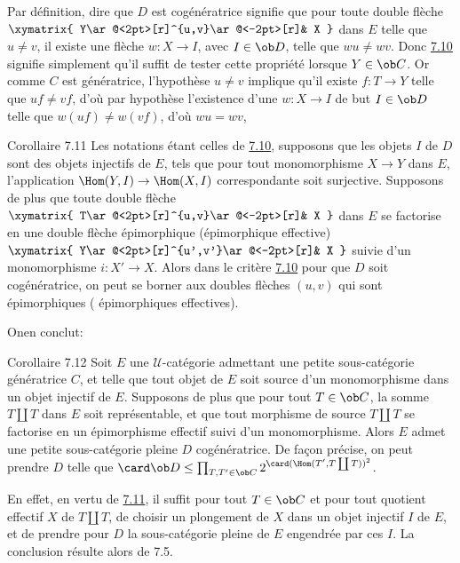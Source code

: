 Par définition, dire que $D$ est cogénératrice signifie que pour
toute double flèche $\xymatrix{ Y\ar@<2pt>[r]^{u,v}\ar@<-2pt>[r]& X
}$ dans $E$ telle que $u\neq v$, il existe une flèche
$w:X\rightarrow I$, avec $I\in\ob D$, telle que $wu\neq wv$. Donc
\hyperref[I.prop7.10]{7.10} signifie simplement qu'il suffit de tester cette
propriété lorsque $Y\in \ob C$. Or comme $C$ est génératrice,
l'hypothèse $u\neq v$ implique qu'il existe $f:T\rightarrow Y$ telle
que $uf\neq vf$, d'où par hypothèse l'existence d'une
$w:X\rightarrow I$ de but $I\in\ob D$ telle que $w(uf)\neq w(vf)$,
d'où $wu=wv$, \cqfd

\begin{enonce*}{Corollaire 7.11}
Les notations étant celles de \hyperref[I.prop7.10]{7.10}, supposons que les
objets $I$ de $D$ sont des objets injectifs de $E$, \ie tels que
pour tout monomorphisme $X\rightarrow Y$ dans $E$, l'application
$\Hom(Y,I)\rightarrow \Hom(X,I)$ correspondante soit surjective.
Supposons de plus que toute double flèche $\xymatrix{
T\ar@<2pt>[r]^{u,v}\ar@<-2pt>[r]& X }$ dans $E$ se factorise en une
double flèche épimorphique (\resp épimorphique effective)
$\xymatrix{ Y\ar@<2pt>[r]^{u',v'}\ar@<-2pt>[r]& X }$ suivie d'un
monomorphisme $i:X'\rightarrow X$. Alors dans le critère
\hyperref[I.prop7.10]{7.10} pour que $D$ soit cogénératrice, on peut se borner
aux doubles flèches $(u,v)$ qui sont épimorphiques (\resp
épimorphiques effectives).
\end{enonce*}

On\pageoriginale en conclut:

\begin{enonce*}{Corollaire 7.12}
Soit $E$ une $𝒰$-catégorie admettant une petite
sous-catégorie génératrice $C$, et telle que tout objet de $E$ soit
source d'un monomorphisme dans un objet injectif de $E$. Supposons
de plus que pour tout $T\in\ob C$, la somme $T\amalg T$ dans $E$
soit représentable, et que tout morphisme de source $T\amalg T$ se
factorise en un épimorphisme effectif suivi d'un monomorphisme.
Alors $E$ admet une petite sous-catégorie pleine $D$ cogénératrice.
De façon précise, on peut prendre $D$ telle que $\card \ob D\leq
\prod_{T,T'\in \ob C}2^{\card(\Hom(T',T\coprod T))^2}$.
\end{enonce*}

En effet, en vertu de \hyperref[I.cor7.11]{7.11}, il suffit pour tout $T\in \ob C$ et pour
tout quotient effectif $X$ de $T\amalg T$, de choisir un plongement
de $X$ dans un objet injectif $I$ de $E$, et de prendre pour $D$ la
sous-catégorie pleine de $E$ engendrée par ces $I$. La conclusion
résulte alors de 7.5.

